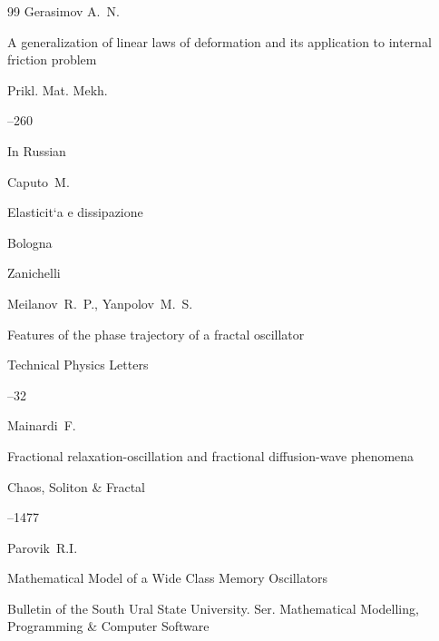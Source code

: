 \begin{thebibliography}{99}
\by Gerasimov A.~N.

\paper A generalization of linear laws of deformation and its application to internal friction problem

\jour Prikl. Mat. Mekh.




--260

\lang In Russian




\by Caputo~M. 

\book Elasticit`a e dissipazione

\publaddr Bologna

\publ Zanichelli






\by Meilanov~R.~P., Yanpolov~M.~S. 

\paper Features of the phase trajectory of a fractal oscillator

\jour Technical Physics Letters




--32





\by Mainardi~F. 

\paper Fractional relaxation-oscillation and fractional diffusion-wave phenomena

\jour Chaos, Soliton \& Fractal




--1477





\by Parovik~R.I. 

\paper Mathematical Model of a Wide Class Memory Oscillators

\jour Bulletin of the South Ural State University. Ser. Mathematical Modelling, Programming \& Computer Software 


\end{thebibliography}
